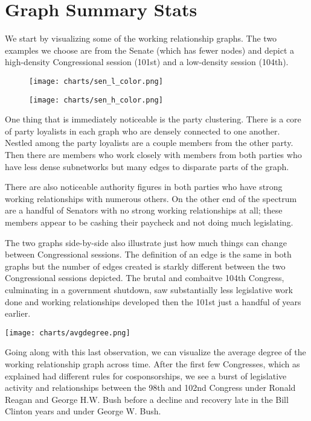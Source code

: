 \section{Graph Summary Stats}

We start by visualizing some of the working relationship graphs. The two examples we choose are from the Senate (which has fewer nodes) and depict a high-density Congressional session (101st) and a low-density session (104th).

\begin{figure}[htbp]
  \centering
  \begin{minipage}[h]{0.4\textwidth}
    \texttt{[image: charts/sen\_l\_color.png]}
  \end{minipage}
  \hfill
  \begin{minipage}[h]{0.4\textwidth}
    \texttt{[image: charts/sen\_h\_color.png]}
  \end{minipage}
\end{figure}

One thing that is immediately noticeable is the party clustering. There is a core of party loyalists in each graph who are densely connected to one another. Nestled among the party loyalists are a couple members from the other party. Then there are members who work closely with members from both parties who have less dense subnetworks but many edges to disparate parts of the graph. 

There are also noticeable authority figures in both parties who have strong working relationships with numerous others. On the other end of the spectrum are a handful of Senators with no strong working relationships at all; these members appear to be cashing their paycheck and not doing much legislating.

The two graphs side-by-side also illustrate just how much things can change between Congressional sessions. The definition of an edge is the same in both graphs but the number of edges created is starkly different between the two Congressional sessions depicted. The brutal and combaitve 104th Congress, culminating in a government shutdown, saw substantially less legislative work done and working relationships developed then the 101st just a handful of years earlier.

\texttt{[image: charts/avgdegree.png]}

Going along with this last observation, we can visualize the average degree of the working relationship graph across time. After the first few Congresses, which as explained had different rules for cosponsorships, we see a burst of legislative activity and relationships between the 98th and 102nd Congress under Ronald Reagan and George H.W. Bush before a decline and recovery late in the Bill Clinton years and under George W. Bush.

